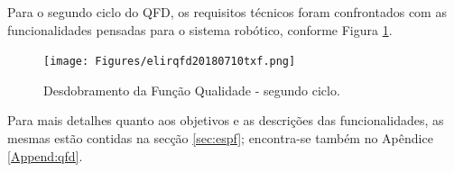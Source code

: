Para o segundo ciclo do QFD, os requisitos técnicos foram confrontados com as funcionalidades pensadas para o sistema robótico, conforme Figura \ref{fig_qfd2}.

\begin{figure}[htb]
	\begin{center}
		\texttt{[image: Figures/elirqfd20180710txf.png]}
	\end{center}
	\caption{Desdobramento da Função Qualidade - segundo ciclo.}
	\label{fig_qfd2}
\end{figure}

Para mais detalhes quanto aos objetivos e as descrições das funcionalidades, as mesmas estão contidas na secção \ref{sec:espf}; encontra-se também no Apêndice \ref{Append:qfd}.



